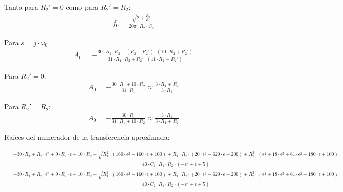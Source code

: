 Tanto para $R_2' = 0$ como para $R_2' = R_2$:
\begin{align}
    &f_0 = \frac{\sqrt{2 + \frac{R_2}{R_1}}}{20 \pi \cdot R_2 \cdot C_2}
\end{align}

Para $s = j \cdot \omega_0$
\begin{align}
    &A_0 = - \frac{30 \cdot R_1 \cdot R_2 + \left(R_2 - R_2'\right) \cdot \left(10 \cdot R_2 + R_2'\right)}{31 \cdot R_1 \cdot R_2 + R_2' \cdot \left(11 \cdot R_2 - R_2'\right)}
\end{align}

Para $R_2' = 0$:
\begin{align}
    &A_0 = - \frac{30 \cdot R_1 + 10 \cdot R_2}{31 \cdot R_1} \approx \frac{3 \cdot R_1 + R_2}{3 \cdot R_1}
\end{align}

Para $R_2' = R_2$:
\begin{align}
    &A_0 = - \frac{30 \cdot R_1}{31 \cdot R_1 + 10 \cdot R_2} \approx \frac{3 \cdot R_1}{3 \cdot R_1 + R_2}
\end{align}

Raíces del numerador de la transferencia aproximada:
\begin{ssmall}
\begin{align}
    &\frac{-30 \cdot R_1 + R_2 \cdot \epsilon^2 + 9 \cdot R_2 \cdot \epsilon - 10 \cdot R_2 - \sqrt{R_1^2 \cdot \left(160 \cdot \epsilon^2 - 160 \cdot \epsilon + 100\right) + R_1 \cdot R_2 \cdot \left(20 \cdot \epsilon^2 - 620 \cdot \epsilon + 200\right) + R_2^2 \cdot \left(\epsilon^4 + 18 \cdot \epsilon^3 + 61 \cdot \epsilon^2 - 180 \cdot \epsilon + 100\right)}}{40 \cdot C_2 \cdot R_1 \cdot R_2 \cdot (-\epsilon^2 + \epsilon + 5)} \\
    &\frac{-30 \cdot R_1 + R_2 \cdot \epsilon^2 + 9 \cdot R_2 \cdot \epsilon - 10 \cdot R_2 + \sqrt{R_1^2 \cdot \left(160 \cdot \epsilon^2 - 160 \cdot \epsilon + 100\right) + R_1 \cdot R_2 \cdot \left(20 \cdot \epsilon^2 - 620 \cdot \epsilon + 200\right) + R_2^2 \cdot \left(\epsilon^4 + 18 \cdot \epsilon^3 + 61 \cdot \epsilon^2 - 180 \cdot \epsilon + 100\right)}}{40 \cdot C_2 \cdot R_1 \cdot R_2 \cdot (-\epsilon^2 + \epsilon + 5)} 
\end{align}
\end{ssmall}

